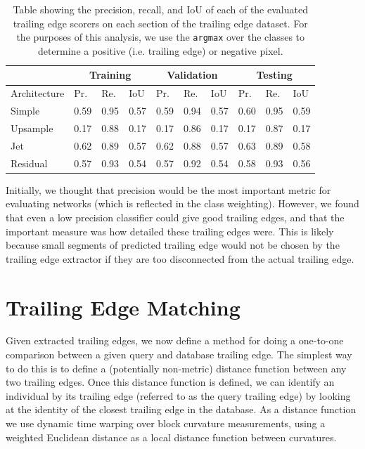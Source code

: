 \begin{table}[!htb]%
	\centering
	\resizebox{\linewidth}{!}
	{
		\begin{tabular} {l || l | l | l || l | l | l || l | l | l |}
		& \multicolumn{3}{c||}{Training} & \multicolumn{3}{c||}{Validation} & \multicolumn{3}{c|}{Testing} \\
		\hline
		Architecture & Pr. & Re. & IoU & Pr. & Re. & IoU & Pr. & Re. & IoU \\
		\hhline{=#===#===#===|}
		Simple & 0.59 & 0.95 & 0.57 & 0.59 & 0.94 & 0.57 & 0.60 & 0.95 & 0.59 \\
		\hline
		Upsample & 0.17 & 0.88 & 0.17 & 0.17 & 0.86 & 0.17 & 0.17 & 0.87 & 0.17 \\
		\hline
		Jet & 0.62 & 0.89 & 0.57 & 0.62 & 0.88 & 0.57 & 0.63 & 0.89 & 0.58 \\
		\hline
		Residual & 0.57 & 0.93 & 0.54 & 0.57 & 0.92 & 0.54 & 0.58 & 0.93 & 0.56 \\
		\hline
		\end{tabular}
	}
	\caption{Table showing the precision, recall, and IoU of each of the evaluated trailing edge scorers on each section of the trailing edge dataset. For the purposes of this analysis, we use the \texttt{argmax} over the classes to determine a positive (i.e. trailing edge) or negative pixel.}
	\label{tab:te_score_full_analysis}
\end{table}

Initially, we thought that precision would be the most important metric for evaluating networks (which is reflected in the class weighting).
However, we found that even a low precision classifier could give good trailing edges, and that the important measure was how detailed these trailing edges were.
This is likely because small segments of predicted trailing edge would not be chosen by the trailing edge extractor if they are too disconnected from the actual trailing edge.


\section{Trailing Edge Matching}

Given extracted trailing edges, we now define a method for doing a one-to-one comparison between a given query and database trailing edge.
The simplest way to do this is to define a (potentially non-metric) distance function between any two trailing edges.
Once this distance function is defined, we can identify an individual by its trailing edge (referred to as the query trailing edge) by looking at the identity of the closest trailing edge in the database.
As a distance function we use dynamic time warping over block curvature measurements, using a weighted Euclidean distance as a local distance function between curvatures.

